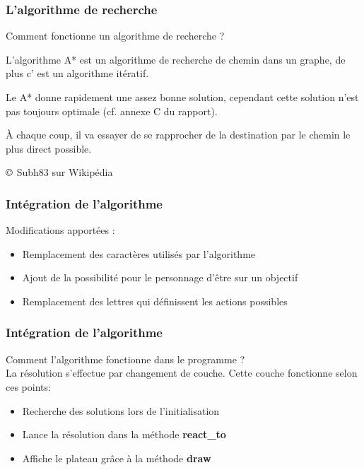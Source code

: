 \documentclass[13pt]{beamer}
\begin{document}
\begin{frame}
	\frametitle{L'algorithme de recherche}
	Comment fonctionne un algorithme de recherche ?
	
	\medskip
	
	L'algorithme A* est un algorithme de recherche de chemin dans un graphe, de plus c' est un algorithme itératif.
	
	\medskip
	
	Le A* donne rapidement une assez bonne solution, cependant cette solution n'est pas toujours optimale (cf. annexe C du rapport).
	
	\medskip
	
	À chaque coup, il va essayer de se rapprocher de la destination par le chemin le plus direct possible.
	
	\begin{center}
		
		{\tiny $\copyright$ Subh83 sur Wikipédia}
		
	\end{center}
\end{frame}

\begin{frame}
    \frametitle{Intégration de l'algorithme}
    Modifications apportées :
    \begin{itemize}
        \item Remplacement des caractères utilisés par l'algorithme 
        \item Ajout de la possibilité pour le personnage d'être sur un objectif
        \item Remplacement des lettres qui définissent les actions possibles
    \end{itemize}
\end{frame}

\begin{frame}
    \frametitle{Intégration de l'algorithme}
    Comment l'algorithme fonctionne dans le programme ?\\
    La résolution s'effectue par changement de couche.
    Cette couche fonctionne selon ces points:
    \begin{itemize}
        \item Recherche des solutions lors de l'initialisation
        \item Lance la résolution dans la méthode \textbf{react\_to}
        \item Affiche le plateau grâce à la méthode \textbf{draw}
    \end{itemize}
\end{frame}
\end{document}
